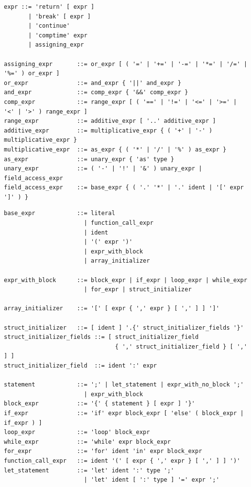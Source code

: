 \begin{lstlisting}[caption={Expression grammar}]
expr ::= 'return' [ expr ]
       | 'break' [ expr ]
       | 'continue'
       | 'comptime' expr
       | assigning_expr

assigning_expr       ::= or_expr [ ( '=' | '+=' | '-=' | '*=' | '/=' | '%=' ) or_expr ]
or_expr              ::= and_expr { '||' and_expr }
and_expr             ::= comp_expr { '&&' comp_expr }
comp_expr            ::= range_expr [ ( '==' | '!=' | '<=' | '>=' | '<' | '>' ) range_expr ]
range_expr           ::= additive_expr [ '..' additive_expr ]
additive_expr        ::= multiplicative_expr { ( '+' | '-' ) multiplicative_expr }
multiplicative_expr  ::= as_expr { ( '*' | '/' | '%' ) as_expr }
as_expr              ::= unary_expr { 'as' type }
unary_expr           ::= ( '-' | '!' | '&' ) unary_expr | field_access_expr
field_access_expr    ::= base_expr { ( '.' '*' | '.' ident | '[' expr ']' ) }
\end{lstlisting}

\begin{lstlisting}[caption={Base expressions and statements}]
base_expr            ::= literal
                       | function_call_expr
                       | ident
                       | '(' expr ')'
                       | expr_with_block
                       | array_initializer

expr_with_block      ::= block_expr | if_expr | loop_expr | while_expr
                       | for_expr | struct_initializer

array_initializer    ::= '[' [ expr { ',' expr } [ ',' ] ] ']'

struct_initializer   ::= [ ident ] '.{' struct_initializer_fields '}'
struct_initializer_fields ::= [ struct_initializer_field
                                { ',' struct_initializer_field } [ ',' ] ]
struct_initializer_field  ::= ident ':' expr

statement            ::= ';' | let_statement | expr_with_no_block ';'
                       | expr_with_block
block_expr           ::= '{' { statement } [ expr ] '}'
if_expr              ::= 'if' expr block_expr [ 'else' ( block_expr | if_expr ) ]
loop_expr            ::= 'loop' block_expr
while_expr           ::= 'while' expr block_expr
for_expr             ::= 'for' ident 'in' expr block_expr
function_call_expr   ::= ident '(' [ expr { ',' expr } [ ',' ] ] ')'
let_statement        ::= 'let' ident ':' type ';'
                       | 'let' ident [ ':' type ] '=' expr ';'
\end{lstlisting}

